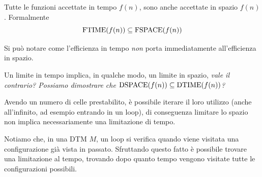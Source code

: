 \begin{theor}
	Tutte le funzioni accettate in tempo $f(n)$, sono anche accettate in spazio $f(n)$. Formalmente
	$$ \text{FTIME} (f(n)) \subseteq \text{FSPACE} (f(n)) $$
\end{theor}

Si può notare come l'efficienza in tempo \textit{non} porta immediatamente all'efficienza in spazio.

Un limite in tempo implica, in qualche modo, un limite in spazio, \textit{vale il contrario? Possiamo dimostrare che $\text{DSPACE} (f(n)) \subseteq \text{DTIME}(f(n))$?}

Avendo un numero di celle prestabilito, è possibile iterare il loro utilizzo (anche all'infinito, ad esempio entrando in un loop), di conseguenza limitare lo spazio non implica necessariamente una limitazione di tempo.

Notiamo che, in una DTM $M$, un loop si verifica quando viene visitata una configurazione già vista in passato. Sfruttando questo fatto è possibile trovare una limitazione al tempo, trovando dopo quanto tempo vengono visitate tutte le configurazioni possibili.\\

